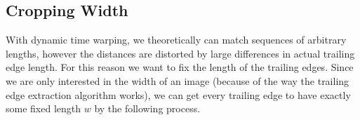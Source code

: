 





\subsection{Cropping Width}


With dynamic time warping, we theoretically can match sequences of arbitrary lengths, however the distances are distorted by large differences in actual trailing edge length.
For this reason we want to fix the length of the trailing edges.
Since we are only interested in the width of an image (because of the way the trailing edge extraction algorithm works), we can get every trailing edge to have exactly some fixed length $w$ by the following process.


